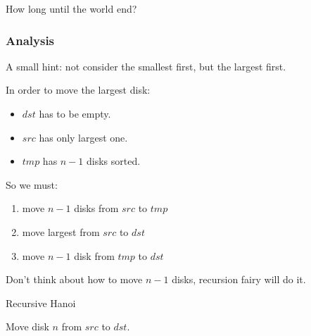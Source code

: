 \question How long until the world end?

\subsubsection{Analysis}
A small hint: not consider the smallest first, but the largest first.

In order to move the largest disk:
\begin{itemize}
    \item $dst$ has to be empty.
    \item $src$ has only largest one.
    \item $tmp$ has $n-1$ disks sorted.
\end{itemize}

So we must:
\begin{enumerate}
    \item move $n-1$ disks from $src$ to $tmp$
    \item move largest from $src$ to $dst$
    \item move $n-1$ disk from $tmp$ to $dst$

\end{enumerate}

Don't think about how to move $n-1$ disks, recursion fairy will do it.

\begin{algorithm}[h]
    \caption{Recursive Hanoi}\label{rec_hanoi}
    \begin{algorithmic}
                \State {}
                \State Move disk $n$ from $src$ to $dst$.
                \State {}
            \EndIf
        \EndProcedure
    \end{algorithmic}
\end{algorithm}

